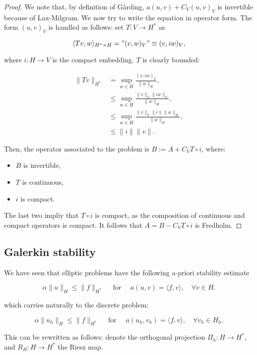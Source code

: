 \documentclass{article}
\begin{document}
\begin{proof}
    We note that, by definition of Gårding,  \(a(u,v) + C_V(u,v)_V\) is invertible because of Lax-Milgram. 
    We now try to write the equation in operator form. The form $(u,v)_V$ is handled as follows: set $T:V\to H^*$ as

    \[\langle Tv, w\rangle_{H^*\times H} = "(v,w)_V"\equiv (v,iw)_V,\]

    where $i: H\to V$ is the compact embedding. $T$ is clearly bounded:

    \begin{align*}
        \|Tv\|_{H^*} &= \sup_{w\in H}\frac{(v,iw)_V}{\|w\|_H},\\
        &\leq \sup_{w\in H}\frac{\|v\|_V\|iw\|_V}{\|w\|_H},\\
        &\leq \sup_{w\in H}\frac{\|v\|_V\|i\|\|w\|_H}{\|w\|_H},\\
        &\leq \|i\|\|v\|.
    \end{align*}

    Then, the operator associated to the problem is $B :=A + C_V T\circ i$, where:
    \begin{itemize}
        \item $B$ is invertible,
        \item $T$ is continuous,
        \item $i$ is compact. 
    \end{itemize}

    The last two impliy that $T\circ i$ is compact, as the composition of continuous and compact operators is compact. 
    It follows that $A = B - C_V T\circ i$ is Fredholm.
\end{proof}



\subsection{Galerkin stability}

We have seen that elliptic problems have the following a-priori stability estimate

\[\alpha \|u\|_H \leq \|f\|_{H^*}\quad\text{ for }\quad a(u,v) = \langle f, v\rangle, \quad \forall v\in H.\]

which carries naturally to the discrete problem:

\[\alpha \|u_h\|_H \leq \|f\|_{H^*}\quad\text{ for }\quad a(u_h,v_h) = \langle f, v\rangle, \quad \forall v_h\in H_h.\]

This can be rewritten as follows: denote the orthogonal projection $\Pi_h: H\to H^*$, and $R_H:H\to H^*$ the Riesz map.
\end{document}
